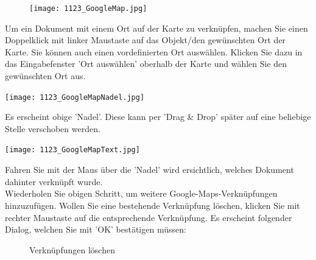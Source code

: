 \vspace{2mm}

\begin{figure}
\vspace{-15pt}
\texttt{[image: 1123\_GoogleMap.jpg]}
\end{figure}

Um ein Dokument mit einem Ort auf der Karte zu verknüpfen, machen Sie einen Doppelklick mit linker Maustaste auf das Objekt/den gewünschten Ort der Karte. Sie können auch einen vordefinierten Ort auswählen. Klicken Sie dazu in das Eingabefenster 'Ort auswählen' oberhalb der Karte und wählen Sie den gewünschten Ort aus.

\vspace{4mm}

\hspace{15mm} \texttt{[image: 1123\_GoogleMapNadel.jpg]}

Es erscheint obige 'Nadel'. Diese kann per 'Drag \& Drop' später auf eine beliebige Stelle verschoben werden.

\hspace{15mm} \texttt{[image: 1123\_GoogleMapText.jpg]}

Fahren Sie mit der Maus über die 'Nadel' wird ersichtlich, welches Dokument dahinter verknüpft wurde. \\

Wiederholen Sie obigen Schritt, um weitere Google-Maps-Verknüpfungen hinzuzufügen. Wollen Sie eine bestehende Verknüpfung löschen, klicken Sie mit rechter Maustaste auf die entsprechende Verknüpfung. Es erscheint folgender Dialog, welchen Sie mit 'OK' bestätigen müssen: 

\begin{figure}[H]
\caption{Verknüpfungen löschen}
\end{figure}

\vspace{\baselineskip}
\pagebreak


